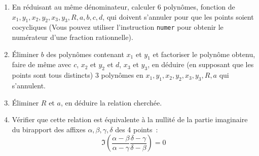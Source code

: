 \documentclass[a4paper,11pt]{book}
\begin{document}
\begin{giacjshere}
\begin{enumerate}
\begin{enumerate}
$R$ et $a=\tan(\theta_0/2)$, $b=\tan(\theta_1/2)$, $c=\tan(\theta_2/2)$
et $d=\tan(\theta_3/2)$. On obtient ainsi 6 \'equations, par exemple les
deux premi\`eres sont de la forme
\[ x_1- F(R,a,b)= 0, \quad y_1- G(R,a,b)= 0 \]
o\`u $F$ et $G$ sont deux fractions rationnelles.
\item En r\'eduisant au m\^eme d\'enominateur, calculer 6 
polyn\^omes, fonction de
$x_1,y_1,x_2,y_2,x_3,y_3,R,a,b,c,d$, qui doivent s'annuler
pour que les points soient cocycliques
(Vous pouvez utiliser l'instruction \verb|numer| pour obtenir le
num\'erateur d'une fraction rationnelle).
\item \'Eliminer $b$ des polyn\^omes
contenant $x_1$ et $y_1$ et factoriser
le polyn\^ome obtenu, faire de m\^eme avec $c$, $x_2$ et $y_2$
et $d$, $x_3$ et $y_3$, en d\'eduire (en supposant que les points sont
tous distincts) 3 polyn\^omes en $x_1,y_1,x_2,y_2,x_3,y_3,R,a$ qui
s'annulent.
\item \'Eliminer $R$ et $a$, en d\'eduire la relation cherch\'ee.
\item V\'erifier que cette relation est \'equivalente \`a la nullit\'e
de la partie imaginaire du birapport des affixes $\alpha, \beta, \gamma,
\delta$ des 4 points~:
\[ \Im \left( \frac{\alpha-\beta}{\alpha-\gamma}
\frac{\delta-\gamma}{\delta-\beta} \right) = 0\]
\end{enumerate}
\end{enumerate}


\end{giacjshere}
\end{document}
